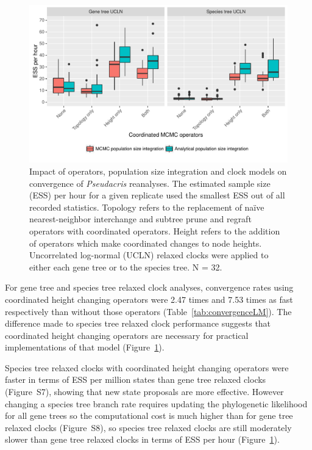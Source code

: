 \documentclass[nogrid]{MBE}%
\begin{document}
\begin{figure}[hb!]
\centering
\includegraphics[width=\textwidth]{minimum_ess_per_hour_boxplot.pdf}
\caption
{Impact of operators, population size integration and clock models on
convergence of \textit{Pseudacris} reanalyses. The estimated sample size (ESS)
per hour for a given replicate used the smallest ESS out of all recorded
statistics. Topology refers to the replacement of na\"ive nearest-neighbor
interchange and subtree prune and regraft operators with coordinated operators.
Height refers to the addition of operators which make coordinated changes to
node heights. Uncorrelated log-normal (UCLN) relaxed clocks were applied to
either each gene tree or to the species tree. N = 32.}
\label{fig:realEssPerHour}
\end{figure}

For gene tree and species tree relaxed clock analyses, convergence rates
using coordinated height changing operators were 2.47 times and 7.53 times
as fast respectively than
without those operators (Table~\ref{tab:convergenceLM}). The
difference made to species tree relaxed clock performance
suggests that coordinated height changing operators are necessary for practical
implementations of that model (Figure~\ref{fig:realEssPerHour}).

Species tree relaxed clocks with coordinated height changing operators were
faster in terms of ESS per million states than gene tree relaxed clocks
(Figure~S7), showing that new state proposals are more effective. However
changing a species tree branch rate requires updating the phylogenetic
likelihood for all gene trees so the computational cost is much higher than for
gene tree relaxed clocks (Figure~S8), so species tree relaxed clocks are still
moderately slower than gene tree relaxed clocks in terms of ESS per hour
(Figure~\ref{fig:realEssPerHour}).
\end{document}
